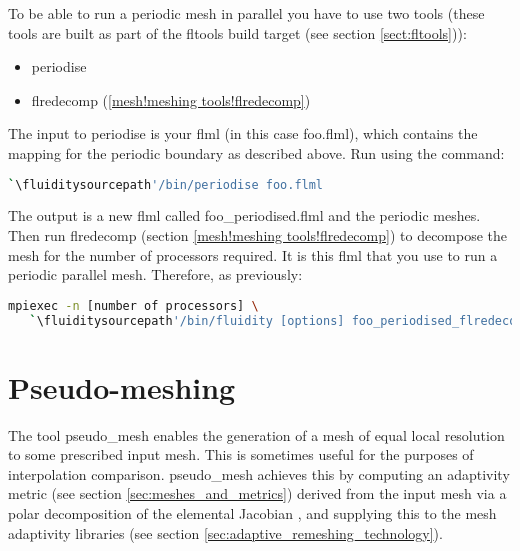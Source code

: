 




To be able to run a periodic mesh in parallel you have to use two tools (these tools are built as part of the fltools build target (see section \ref{sect:fltools})):

\begin{itemize}
\item periodise
\item flredecomp (\ref{mesh!meshing tools!flredecomp})
\end{itemize}

The input to periodise is your flml (in this case foo.flml), which contains the mapping for the periodic boundary as described above. Run using the command:

\begin{lstlisting}[language=bash]
`\fluiditysourcepath'/bin/periodise foo.flml
\end{lstlisting}

The output is a new flml called  foo\_periodised.flml and the periodic meshes. Then run flredecomp (section \ref{mesh!meshing tools!flredecomp}) to decompose the mesh for the number of processors required. It is this flml that you use to run a periodic parallel mesh. Therefore, as previously:

\begin{lstlisting}[language=bash]
mpiexec -n [number of processors] \
   `\fluiditysourcepath'/bin/fluidity [options] foo_periodised_flredecomp.flml
\end{lstlisting}

\section{Pseudo-meshing}

The tool pseudo\_mesh enables the generation of a mesh of equal local resolution
to some prescribed input mesh. This is sometimes useful for the purposes of
interpolation comparison. pseudo\_mesh achieves this by computing an adaptivity
metric (see section \ref{sec:meshes_and_metrics}) derived from the input mesh
via a polar decomposition of the
elemental Jacobian \citep{micheletti2006}, and supplying this to the mesh adaptivity libraries
(see section \ref{sec:adaptive_remeshing_technology}).

